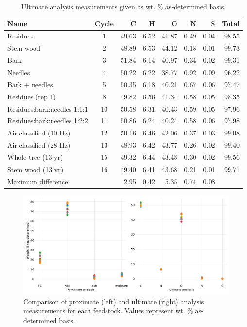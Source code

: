 \documentclass[12pt,titlepage]{article}
\begin{document}
\begin{table}[H]
    \caption{Ultimate analysis measurements given as wt. \% as-determined basis.}
    \label{tab:ultimate}
    \centering
    \begin{tabular}{lcrrrrrr}
        \toprule
        Name & Cycle & C & H & O & N & S & Total \\
        \midrule
        Residues                    & 1  & 49.63 & 6.52 & 41.87 & 0.49 & 0.04 & 98.55 \\
        Stem wood                   & 2  & 48.89 & 6.53 & 44.12 & 0.18 & 0.01 & 99.73 \\
        Bark                        & 3  & 51.84 & 6.14 & 40.97 & 0.34 & 0.02 & 99.31 \\
        Needles                     & 4  & 50.22 & 6.22 & 38.77 & 0.92 & 0.09 & 96.22 \\
        Bark + needles              & 5  & 50.35 & 6.18 & 40.21 & 0.67 & 0.06 & 97.47 \\
        Residues (rep 1)            & 8  & 49.82 & 6.56 & 41.34 & 0.58 & 0.05 & 98.35 \\
        Residues:bark:needles 1:1:1 & 10 & 50.58 & 6.31 & 40.43 & 0.59 & 0.05 & 97.96 \\
        Residues:bark:needles 1:2:2 & 11 & 50.86 & 6.24 & 40.24 & 0.58 & 0.06 & 97.98 \\
        Air classified (10 Hz)      & 12 & 50.16 & 6.46 & 42.06 & 0.37 & 0.03 & 99.08 \\
        Air classified (28 Hz)      & 13 & 48.93 & 6.42 & 43.77 & 0.26 & 0.02 & 99.40 \\
        Whole tree (13 yr)          & 15 & 49.32 & 6.44 & 43.48 & 0.30 & 0.02 & 99.56 \\
        Stem wood (13 yr)           & 16 & 49.40 & 6.41 & 43.68 & 0.21 & 0.01 & 99.71 \\
        \cmidrule{3-7}
        \multicolumn{2}{l}{Maximum difference} & 2.95 & 0.42 & 5.35 & 0.74 & 0.08 & \\
        \bottomrule
    \end{tabular}
\end{table}

\begin{figure}[H]
    \centering
    \includegraphics[width=\textwidth]{figures/prox-ult-analysis.pdf}
    \caption{Comparison of proximate (left) and ultimate (right) analysis measurements for each feedstock. Values represent wt. \% as-determined basis.}
    \label{fig:prox-ult-analysis}
\end{figure}
\end{document}

